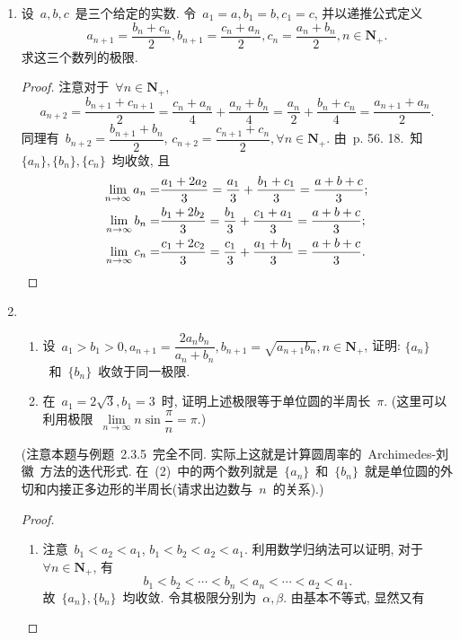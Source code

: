 \documentclass[UTF8,a4paper,11pt,twoside]{book}
\begin{document}
\begin{enumerate}
	\item 设~$a,b,c$~是三个给定的实数. 令~$a_1=a, b_1=b, c_1=c$, 并以递推公式定义
	      \[
		      a_{n+1}=\dfrac{b_n+c_n}{2}, b_{n+1}=\dfrac{c_n+a_n}{2}, c_n=\dfrac{a_n+b_n}{2}, n\in\mathbf{N}_{+}.
	      \]
	      求这三个数列的极限.
	      \begin{proof}
		      注意对于~$\forall n\in\mathbf{N}_{+}$,
		      \[
			      a_{n+2}=\dfrac{b_{n+1}+c_{n+1}}{2}=\dfrac{c_n+a_n}{4}+\dfrac{a_n+b_n}{4}=\dfrac{a_n}{2}+\dfrac{b_n+c_n}{4}=\dfrac{a_{n+1}+a_{n}}{2}.
		      \]
		      同理有~$b_{n+2}=\dfrac{b_{n+1}+b_n}{2}$, $c_{n+2}=\dfrac{c_{n+1}+c_n}{2}, \forall n\in\mathbf{N}_{+}$. 由~p. 56. 18.~知~$\{a_n\}, \{b_n\}, \{c_n\}$~均收敛, 且
		      \[
			      \begin{split}
				      \lim\limits_{n\to\infty} a_n=&\dfrac{a_1+2a_2}{3}=\dfrac{a_1}{3}+\dfrac{b_1+c_1}{3}=\dfrac{a+b+c}{3};\\
				      \lim\limits_{n\to\infty} b_n=&\dfrac{b_1+2b_2}{3}=\dfrac{b_1}{3}+\dfrac{c_1+a_1}{3}=\dfrac{a+b+c}{3};\\
				      \lim\limits_{n\to\infty} c_n=&\dfrac{c_1+2c_2}{3}=\dfrac{c_1}{3}+\dfrac{a_1+b_1}{3}=\dfrac{a+b+c}{3}. \qedhere
			      \end{split}
		      \]
	      \end{proof}
	\item
	      \begin{enumerate}[(1)]
		      \item 设~$a_1>b_1>0, a_{n+1}=\dfrac{2a_nb_n}{a_n+b_n}, b_{n+1}=\sqrt{a_{n+1}b_n}, n\in\mathbf{N}_{+}$, 证明: $\{a_n\}$~和~$\{b_n\}$~收敛于同一极限.
		      \item 在~$a_1=2\sqrt{3}, b_1=3$~时, 证明上述极限等于单位圆的半周长~$\pi$. (这里可以利用极限~$\lim\limits_{n\to\infty} n\sin{\dfrac{\pi}{n}}=\pi$.)
	      \end{enumerate}
	      (注意本题与例题~2.3.5~完全不同. 实际上这就是计算圆周率的~Archimedes-刘徽~方法的迭代形式. 在~(2)~中的两个数列就是~$\{a_n\}$~和~$\{b_n\}$~就是单位圆的外切和内接正多边形的半周长(请求出边数与~$n$~的关系).)
	      \begin{proof}
		      \begin{enumerate}[(1)]
			      \item 注意~$b_1<a_2<a_1$, $b_1<b_2<a_2<a_1$. 利用数学归纳法可以证明, 对于~$\forall n\in\mathbf{N}_{+}$, 有
			            \[
				            b_1<b_2<\cdots<b_n<a_n<\cdots<a_2<a_1.
			            \]
			            故~$\{a_n\}, \{b_n\}$~均收敛. 令其极限分别为~$\alpha, \beta$. 由基本不等式, 显然又有

\end{enumerate}
\end{proof}
\end{enumerate}
\end{document}
